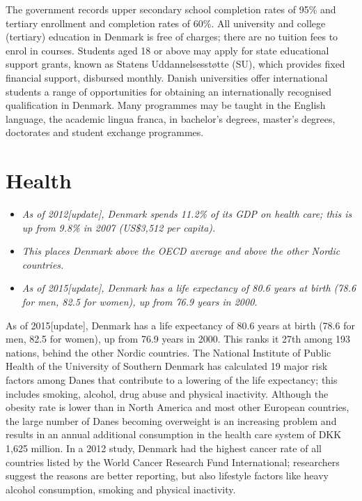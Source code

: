The government records upper secondary school completion rates of 95\%
and tertiary enrollment and completion rates of 60\%. All university and
college (tertiary) education in Denmark is free of charges; there are no
tuition fees to enrol in courses. Students aged 18 or above may apply
for state educational support grants, known as Statens Uddannelsesstøtte
(SU), which provides fixed financial support, disbursed monthly. Danish
universities offer international students a range of opportunities for
obtaining an internationally recognised qualification in Denmark. Many
programmes may be taught in the English language, the academic lingua
franca, in bachelor's degrees, master's degrees, doctorates and student
exchange programmes.

\section{Health}\label{health}

\begin{itemize}
\item
  \emph{As of 2012{[}update{]}, Denmark spends 11.2\% of its GDP on
  health care; this is up from 9.8\% in 2007 (US\$3,512 per capita).}
\item
  \emph{This places Denmark above the OECD average and above the other
  Nordic countries.}
\item
  \emph{As of 2015{[}update{]}, Denmark has a life expectancy of 80.6
  years at birth (78.6 for men, 82.5 for women), up from 76.9 years in
  2000.}
\end{itemize}

As of 2015{[}update{]}, Denmark has a life expectancy of 80.6 years at
birth (78.6 for men, 82.5 for women), up from 76.9 years in 2000. This
ranks it 27th among 193 nations, behind the other Nordic countries. The
National Institute of Public Health of the University of Southern
Denmark has calculated 19 major risk factors among Danes that contribute
to a lowering of the life expectancy; this includes smoking, alcohol,
drug abuse and physical inactivity. Although the obesity rate is lower
than in North America and most other European countries, the large
number of Danes becoming overweight is an increasing problem and results
in an annual additional consumption in the health care system of DKK
1,625 million. In a 2012 study, Denmark had the highest cancer rate of
all countries listed by the World Cancer Research Fund International;
researchers suggest the reasons are better reporting, but also lifestyle
factors like heavy alcohol consumption, smoking and physical inactivity.


